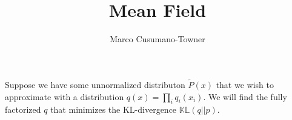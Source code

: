 \documentclass[11pt]{article}
\title{Mean Field}
\author{Marco Cusumano-Towner}
\newcommand{\KL}[2]{\mathbb{KL}\left(#1||#2\right)}
\newcommand{\KL}[2]{\mathbb{KL}\left(#1||#2\right)}
\begin{document}
Suppose we have some unnormalized distributon $\tilde{P}(x)$ that we
wish to approximate with a distribution $q(x) = \prod_i q_i(x_i)$. We will find the fully factorized $q$ that minimizes the KL-divergence $\KL{q}{p}$. 
\end{document}
